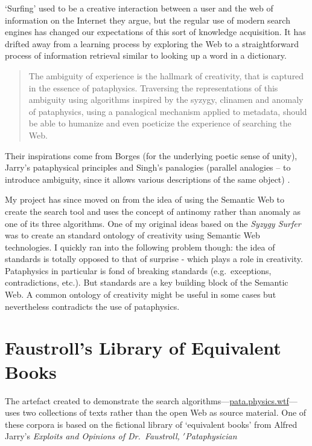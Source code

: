 `Surfing' used to be a creative interaction between a user and the web of information on the Internet they argue, but the regular use of modern search engines has changed our expectations of this sort of knowledge acquisition. It has drifted away from a learning process by exploring the Web to a straightforward process of information retrieval similar to looking up a word in a dictionary.

\begin{quotation}
  The ambiguity of experience is the hallmark of creativity, that is captured in the essence of pataphysics. Traversing the representations of this ambiguity using algorithms inspired by the syzygy, clinamen and anomaly of pataphysics, using a panalogical mechanism applied to metadata, should be able to humanize and even poeticize the experience of searching the Web. 
\end{quotation}

Their inspirations come from Borges \citeyear{Borges2000} (for the underlying poetic sense of unity), Jarry's pataphysical principles \citeyear{Jarry1996} and Singh's panalogies (parallel analogies – to introduce ambiguity, since it allows various descriptions of the same object) \citeyear{Singh2005}.

My project has since moved on from the idea of using the Semantic Web to create the search tool and uses the concept of antinomy rather than anomaly as one of its three algorithms. One of my original ideas based on the \emph{Syzygy Surfer} was to create an standard ontology of creativity using Semantic Web technologies. I quickly ran into the following problem though: the idea of standards is totally opposed to that of surprise - which plays a role in creativity. Pataphysics in particular is fond of breaking standards (e.g.\ exceptions, contradictions, etc.). But standards are a key building block of the Semantic Web. A common ontology of creativity might be useful in some cases but nevertheless contradicts the use of pataphysics.


\section{Faustroll's Library of Equivalent Books}
\label{s:faustlib}

The artefact created to demonstrate the search algorithms---\url{pata.physics.wtf}---uses two collections of texts rather than the open Web as source material. One of these corpora is based on the fictional library of `equivalent books' from Alfred Jarry's \emph{Exploits and Opinions of Dr.\ Faustroll, $'$Pataphysician} \citeyear[p.10-12]{Jarry1996}


